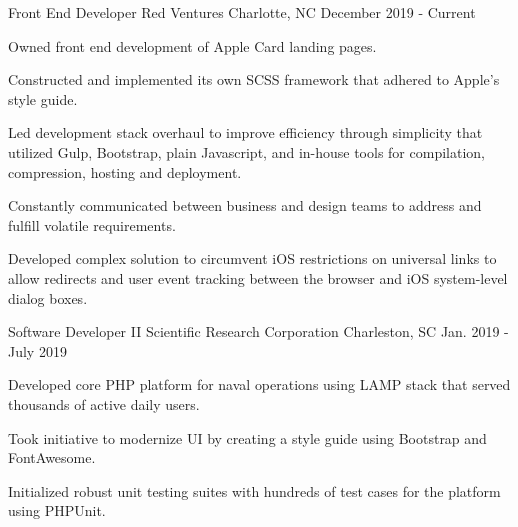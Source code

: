 \begin{cventries}

  \cventry
    {Front End Developer} %
    {Red Ventures} %
    {Charlotte, NC} %
    {December 2019 - Current} %
    {
      \begin{cvitems} %
        \item {Owned front end development of Apple Card landing pages.}
        \item {Constructed and implemented its own SCSS framework that adhered to Apple's style guide.}
        \item {Led development stack overhaul to improve efficiency through simplicity that utilized Gulp, Bootstrap, plain Javascript, and in-house tools for compilation, compression, hosting and deployment.}
        \item {Constantly communicated between business and design teams to address and fulfill volatile requirements.}
        \item {Developed complex solution to circumvent iOS restrictions on universal links to allow redirects and user event tracking between the browser and iOS system-level dialog boxes.}
      \end{cvitems}
    }

  \cventry
    {Software Developer II} %
    {Scientific Research Corporation} %
    {Charleston, SC} %
    {Jan. 2019 - July 2019} %
    {
      \begin{cvitems} %
        \item {Developed core PHP platform for naval operations using LAMP stack that served thousands of active daily users.}
        \item {Took initiative to modernize UI by creating a style guide using Bootstrap and FontAwesome.}
        \item {Initialized robust unit testing suites with hundreds of test cases for the platform using PHPUnit.}
      \end{cvitems}
    }


\end{cventries}
